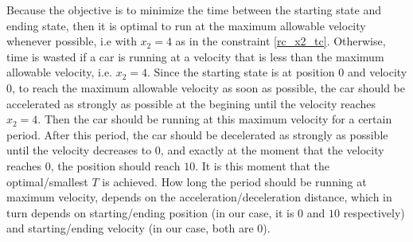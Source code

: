 Because the objective is to minimize the time between the starting state and ending state, then it is optimal to run at the maximum allowable velocity whenever possible, i.e with $x_2 =4$ as in the constraint \ref{rc_x2_tc}. Otherwise, time is wasted if a car is running at a velocity that is less than the maximum allowable velocity, i.e. $x_2=4$. Since the starting state is at position $0$ and velocity $0$, to reach the maximum allowable velocity as soon as possible, the car should be accelerated as strongly as possible at the begining until the velocity reaches $x_2 =4$. Then the car should be running at this maximum velocity for a certain period. After this period, the car should be decelerated as strongly as possible until the velocity decreases to $0$, and exactly at the moment that the velocity reaches $0$, the position should reach $10$. It is this moment that the optimal/smallest $T$ is achieved. How long the period should be running at maximum velocity, depends on the acceleration/deceleration distance, which in turn depends on  starting/ending position (in our case, it is $0$ and $10$ respectively) and starting/ending velocity (in our case, both are $0$). 






